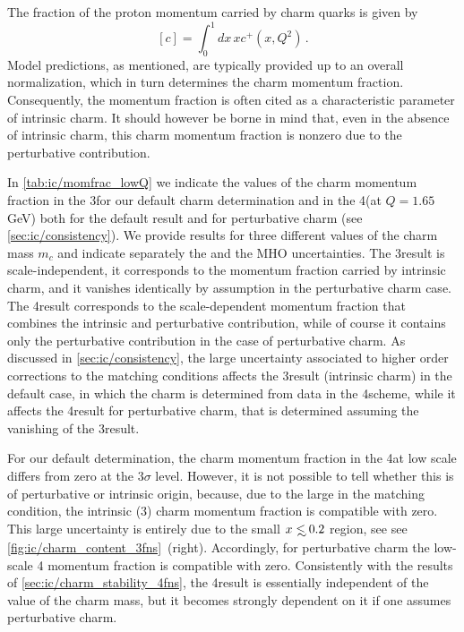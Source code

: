 
The fraction of the proton momentum carried by charm quarks
is given by
\begin{equation}
\label{eq:ic/charm_momentum_fraction}
\left[ c\right] = \int_0^1dx\, x c^+(x,Q^2) \, .
\end{equation}
Model predictions, as mentioned, are typically provided up to an
overall normalization, which in turn determines the charm momentum fraction.
%
Consequently, the momentum fraction is often cited as a characteristic
parameter of intrinsic charm.
%
It should however be borne in mind that,
even in the absence of intrinsic charm, this charm momentum fraction is nonzero due
to the perturbative contribution.

In \cref{tab:ic/momfrac_lowQ} we indicate
the values of the charm momentum fraction
 in the 3\fns for our default charm
  determination and in the 4\fns  (at $Q=1.65$ GeV) both for the
  default result and for perturbative charm \pdf (see \cref{sec:ic/consistency}).
%
We provide results for  three different values of the charm mass $m_c$ and
indicate separately the \pdf and the MHO uncertainties.
%
The 3\fns result is scale-independent, it corresponds to the
momentum fraction carried by intrinsic charm, and it vanishes identically
by assumption in the perturbative charm case.
%
The 4\fns result corresponds to
the scale-dependent momentum fraction that combines the intrinsic and
perturbative contribution, while of course it contains only the
perturbative contribution in the case of perturbative charm.
%
As
discussed in \cref{sec:ic/consistency}, the large uncertainty
associated to higher order corrections to the matching conditions
affects the 3\fns result (intrinsic charm) in the default case, in
which the charm \pdf is determined from data in the 4\fns scheme, while
it affects the 4\fns result for perturbative charm, that is determined
assuming the vanishing of the 3\fns result.

 For our default determination, the charm
momentum fraction in the 4\fns at low scale
differs from zero at the $3\sigma$
level.
%
However, it is not possible to tell whether this is of
perturbative or intrinsic origin, because, due to  the large \mhou in
the matching condition, the intrinsic (3\fns) charm momentum fraction
is compatible with zero. This large uncertainty is entirely due to the
small $x\lsim 0.2$ region, see see
\cref{fig:ic/charm_content_3fns}~(right).
%
Accordingly, for perturbative charm the
low-scale 4\fns
momentum fraction is compatible with zero.
%
Consistently with the results of \cref{sec:ic/charm_stability_4fns},
the 4\fns result is essentially independent of the value of the charm
mass, but it becomes strongly dependent on it if one assumes
perturbative charm.


